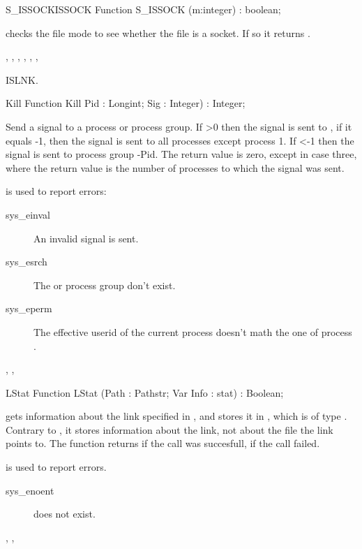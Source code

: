 \begin{functionl}{S\_ISSOCK}{ISSOCK}
\Declaration
Function S\_ISSOCK (m:integer) : boolean;

\Description
  checks the file mode  to see whether the file is a
socket. If so it returns .

\Errors
{},
 , 
 ,
 ,
 ,
 ,

\SeeAlso
ISLNK.
\end{functionl}
\begin{function}{Kill}
\Declaration
Function Kill Pid : Longint; Sig : Integer) : Integer;

\Description
 Send a signal  to a process or process group. If >0 then
the signal is sent to , if it equals -1, then the signal is sent to
all processes except process 1. If <-1 then the signal is sent to
process group -Pid.
The return value is zero, except in case three, where the return value is the
number of processes to which the signal was sent.

\Errors
{} is used to report errors:
\begin{description}
\item[sys\_einval] An invalid signal is sent.
\item[sys\_esrch] The  or process group don't exist.
\item[sys\_eperm] The effective userid of the current process doesn't math
the one of process .
\end{description}

\SeeAlso
{}, ,  
\end{function}
\begin{function}{LStat}
\Declaration
Function LStat (Path : Pathstr; Var Info : stat) : Boolean;

\Description

 gets information about the link specified in , and stores it in 
, which is of type . Contrary to , it stores
information about the link, not about the file the link points to.
The function returns  if the call was succesfull,  if the call
failed.

\Errors
  is used to report errors.
\begin{description}
\item[sys\_enoent]  does not exist.
\end{description}

\SeeAlso
{}, , 
\end{function}
